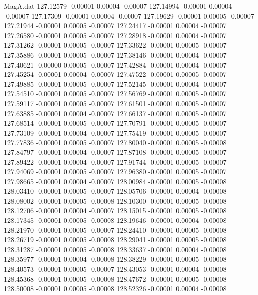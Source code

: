\begin{filecontents}{MagA.dat}
 127.12579   -0.00001    0.00004   -0.00007
 127.14994   -0.00001    0.00004   -0.00007
 127.17309   -0.00001    0.00004   -0.00007
 127.19629   -0.00001    0.00005   -0.00007
 127.21944   -0.00001    0.00005   -0.00007
 127.24417   -0.00001    0.00004   -0.00007
 127.26580   -0.00001    0.00005   -0.00007
 127.28918   -0.00001    0.00004   -0.00007
 127.31262   -0.00001    0.00005   -0.00007
 127.33622   -0.00001    0.00005   -0.00007
 127.35886   -0.00001    0.00005   -0.00007
 127.38146   -0.00001    0.00004   -0.00007
 127.40621   -0.00000    0.00005   -0.00007
 127.42884   -0.00001    0.00004   -0.00007
 127.45254   -0.00001    0.00004   -0.00007
 127.47522   -0.00001    0.00005   -0.00007
 127.49885   -0.00001    0.00005   -0.00007
 127.52145   -0.00001    0.00004   -0.00007
 127.54510   -0.00001    0.00005   -0.00007
 127.56769   -0.00001    0.00005   -0.00007
 127.59117   -0.00001    0.00005   -0.00007
 127.61501   -0.00001    0.00005   -0.00007
 127.63885   -0.00001    0.00004   -0.00007
 127.66137   -0.00001    0.00005   -0.00007
 127.68514   -0.00001    0.00005   -0.00007
 127.70791   -0.00001    0.00005   -0.00007
 127.73109   -0.00001    0.00004   -0.00007
 127.75419   -0.00001    0.00005   -0.00007
 127.77836   -0.00001    0.00005   -0.00007
 127.80040   -0.00001    0.00005   -0.00008
 127.84797   -0.00001    0.00004   -0.00007
 127.87108   -0.00001    0.00005   -0.00007
 127.89422   -0.00001    0.00004   -0.00007
 127.91744   -0.00001    0.00005   -0.00007
 127.94069   -0.00001    0.00005   -0.00007
 127.96380   -0.00001    0.00005   -0.00007
 127.98665   -0.00001    0.00004   -0.00007
 128.00984   -0.00001    0.00005   -0.00008
 128.03410   -0.00001    0.00005   -0.00007
 128.05706   -0.00001    0.00004   -0.00008
 128.08002   -0.00001    0.00005   -0.00008
 128.10300   -0.00001    0.00005   -0.00008
 128.12706   -0.00001    0.00004   -0.00007
 128.15015   -0.00001    0.00005   -0.00008
 128.17345   -0.00001    0.00005   -0.00008
 128.19646   -0.00001    0.00004   -0.00008
 128.21970   -0.00001    0.00005   -0.00007
 128.24410   -0.00001    0.00005   -0.00008
 128.26719   -0.00001    0.00005   -0.00008
 128.29041   -0.00001    0.00005   -0.00008
 128.31287   -0.00001    0.00005   -0.00008
 128.33637   -0.00001    0.00004   -0.00008
 128.35977   -0.00001    0.00004   -0.00008
 128.38229   -0.00001    0.00005   -0.00008
 128.40573   -0.00001    0.00005   -0.00007
 128.43053   -0.00001    0.00004   -0.00008
 128.45368   -0.00001    0.00005   -0.00008
 128.47672   -0.00001    0.00005   -0.00008
 128.50008   -0.00001    0.00005   -0.00008
 128.52326   -0.00001    0.00004   -0.00008

\end{filecontents}

